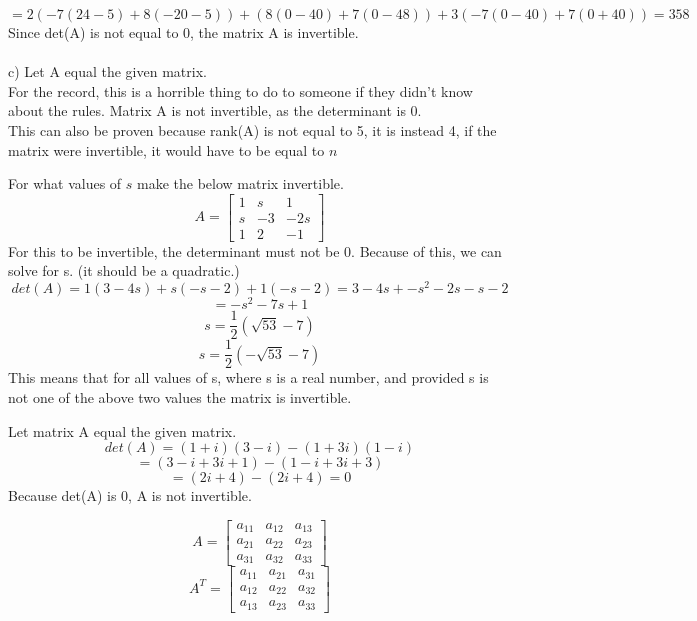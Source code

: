 \documentclass[12pt]{article}
\newcommand{\sqbrl}{\left[}
\newcommand{\sqbrr}{\right]}
\newenvironment{problem}[2][Problem]{\begin{trivlist}
\item[\hskip \labelsep {\bfseries #1}\hskip \labelsep {\bfseries #2.}]}{\end{trivlist}}
\begin{document}
\[= 2( -7(24 -5) + 8(-20 -5)) + (8(0 - 40) + 7( 0 -48)) + 3(-7(0-40) + 7(0+40)) = 358\]
Since det(A) is not equal to 0, the matrix A is invertible.\\\\

c) Let A equal the given matrix.\\
For the record, this is a horrible thing to do to someone if they didn't know about the rules.
Matrix A is not invertible, as the determinant is 0.\\
This can also be proven because rank(A) is not equal to 5, it is instead 4, if the matrix were invertible, it would have to be equal to $n$

\begin{problem}{7}
\end{problem}
For what values of $s$ make the below matrix invertible.
\[A = \sqbrl\begin{matrix}1 & s & 1\\s & -3 & -2s\\1 & 2 & -1\end{matrix}\sqbrr\]
For this to be invertible, the determinant must not be 0. Because of this, we can solve for s. (it should be a quadratic.)\\
\[det(A) = 1(3 - 4s) + s(-s -2) + 1 (-s -2) = 3 - 4s + -s^2 -2s -s -2\]
\[= -s^2 -7s + 1\]
\[ s = \frac{1}{2}(\sqrt{53} -7)\]
\[ s = \frac{1}{2}(-\sqrt{53} -7)\]
This means that for all values of s, where s is a real number, and provided s is not one of the above two values the matrix is invertible.\\

\begin{problem}{8}
\end{problem}
Let matrix A equal the given matrix.\\
\[det(A) = (1+i)(3-i) - (1+3i)(1-i)\]
\[= (3 - i + 3i +1) - (1 - i + 3i +3)\]
\[= (2i + 4) - (2i + 4) = 0\]
Because det(A) is 0, A is not invertible.\\

\begin{problem}{9}
\end{problem}
\[A = \sqbrl\begin{matrix}a_{11} & a_{12} & a_{13}\\a_{21} & a_{22} & a_{23}\\a_{31} & a_{32} & a_{33}\end{matrix}\sqbrr\]
\[A^T = \sqbrl\begin{matrix}a_{11} & a_{21} & a_{31}\\a_{12} & a_{22} & a_{32}\\a_{13} & a_{23} & a_{33}\end{matrix}\sqbrr\]
\end{document}
